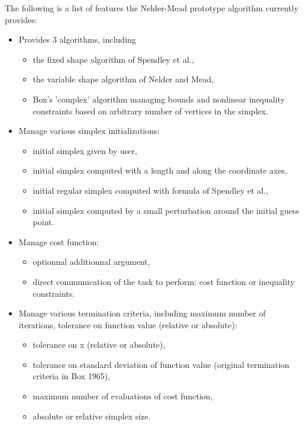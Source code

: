 \begin{Description}
\begin{itemize}
\end{itemize}



The following is a list of features the Nelder-Mead prototype algorithm
currently provides:\begin{itemize}

\item Provides 3 algorithms, including \begin{itemize}

\item the fixed shape algorithm of Spendley et al.,
\item the variable shape algorithm of Nelder and Mead,
\item Box's 'complex' algorithm managing bounds and nonlinear inequality
constraints based on arbitrary number of vertices in the simplex.

\end{itemize}

\item Manage various simplex initializations: \begin{itemize}

\item initial simplex given by user,
\item initial simplex computed with a length and along the coordinate
axes,
\item initial regular simplex computed with formula of Spendley et al.,
\item initial simplex computed by a small perturbation around the initial
guess point.

\end{itemize}

\item Manage cost function: \begin{itemize}

\item optionnal additionnal argument,
\item direct communication of the task to perform: cost function or
inequality constraints.

\end{itemize}

\item Manage various termination criteria, including maximum number of
iterations, tolerance on function value (relative or absolute):\begin{itemize}

\item tolerance on x (relative or absolute),
\item tolerance on standard deviation of function value (original
termination criteria in Box 1965),
\item maximum number of evaluations of cost function,
\item absolute or relative simplex size.


\end{itemize}
\end{itemize}
\end{Description}
